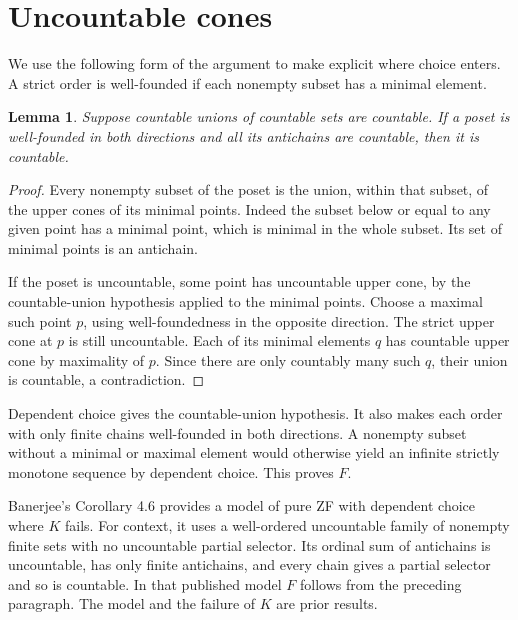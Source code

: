 \documentclass[11pt]{article}
\newtheorem{lemma}[theorem]{Lemma}
\begin{document}
\section{Uncountable cones}
We use the following form of the argument to make explicit where choice enters. A strict order is well-founded if each nonempty subset has a minimal element.
\begin{lemma}
Suppose countable unions of countable sets are countable. If a poset is well-founded in both directions and all its antichains are countable, then it is countable.
\end{lemma}
\begin{proof}
Every nonempty subset of the poset is the union, within that subset, of the upper cones of its minimal points. Indeed the subset below or equal to any given point has a minimal point, which is minimal in the whole subset. Its set of minimal points is an antichain.

If the poset is uncountable, some point has uncountable upper cone, by the countable-union hypothesis applied to the minimal points. Choose a maximal such point $p$, using well-foundedness in the opposite direction. The strict upper cone at $p$ is still uncountable. Each of its minimal elements $q$ has countable upper cone by maximality of $p$. Since there are only countably many such $q$, their union is countable, a contradiction.
\end{proof}
Dependent choice gives the countable-union hypothesis. It also makes each order with only finite chains well-founded in both directions. A nonempty subset without a minimal or maximal element would otherwise yield an infinite strictly monotone sequence by dependent choice. This proves $F$.

Banerjee's Corollary 4.6 \cite{ban} provides a model of pure ZF with dependent choice where $K$ fails. For context, it uses a well-ordered uncountable family of nonempty finite sets with no uncountable partial selector. Its ordinal sum of antichains is uncountable, has only finite antichains, and every chain gives a partial selector and so is countable. In that published model $F$ follows from the preceding paragraph. The model and the failure of $K$ are prior results.
\end{document}
